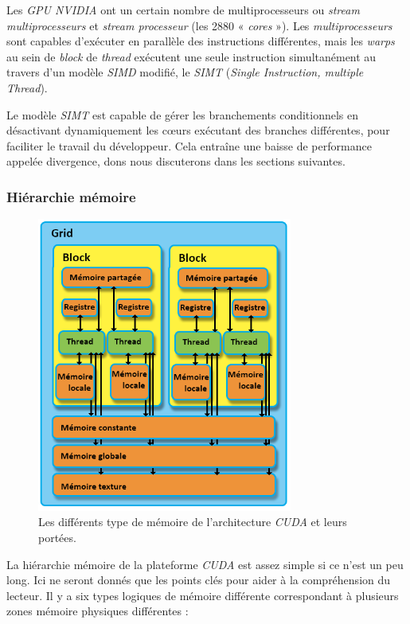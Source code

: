 \documentclass[french, 11pt]{memoir}
\begin{document}
Les \emph{GPU NVIDIA} ont un certain nombre de multiprocesseurs ou
\emph{stream multiprocesseurs} et \emph{stream
processeur} (les 2880 « \textit{cores} »). Les \emph{multiprocesseurs} sont
capables d'exécuter en parallèle des instructions différentes, mais les 
\textit{warps} au sein de \emph{block} de \textit{thread} exécutent une seule
instruction simultanément au travers d'un modèle \emph{SIMD} modifié, le
\emph{SIMT} (\emph{Single Instruction, multiple Thread}). 

\bigskip
Le modèle \emph{SIMT} est capable de gérer les branchements
conditionnels en désactivant dynamiquement les cœurs exécutant des
branches différentes, pour faciliter le travail du développeur. Cela
entraîne une baisse de performance appelée divergence, dons nous
discuterons dans les sections suivantes.

\subsubsection{Hiérarchie mémoire}\label{hiuxe9rarchie-muxe9moire}

\begin{figure}[htbp]
	\begin{center}
		\includegraphics[width=3.3in]{img/cuda_memory.png}
		\caption{Les différents type de mémoire de l'architecture \textit{CUDA} et leurs portées.}
	\end{center}
\end{figure}

La hiérarchie mémoire de la plateforme \emph{CUDA} est assez simple si
ce n'est un peu long. Ici ne seront donnés que les points clés pour
aider à la compréhension du lecteur. Il y a six types logiques de
mémoire différente correspondant à plusieurs zones mémoire physiques
différentes :
\end{document}
